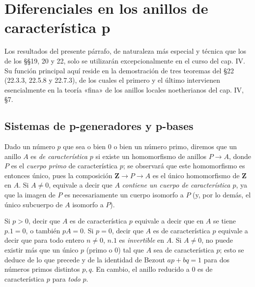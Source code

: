 \section{Diferenciales en los anillos de característica p}
Los resultados del presente párrafo, de naturaleza más especial y técnica que
los de los §§19, 20 y 22, solo se utilizarán excepcionalmente en el curso del
cap. IV. Su función principal aquí reside en la demostración de tres teoremas del §22
(22.3.3, 22.5.8 y 22.7.3), de los cuales el primero y el último intervienen
esencialmente en la teoría «fina» de los anillos locales noetherianos del
cap. IV, §7.
\subsection{Sistemas de p-generadores y p-bases}
\label{0.21.1-fr}

\begin{env}[21.1.1]
\label{0.21.1.1-fr}
Dado un número $p$ que sea o bien $0$ o bien un número primo, diremos que un
anillo $A$ es \emph{de característica $p$} si existe un homomorfismo de anillos
$P\to A$, donde $P$ es el \emph{cuerpo primo} de característica $p$; se observará que
este homomorfismo es entonces único, pues la composición
$\mathbf Z\to P\to A$ es el único homomorfismo de $\mathbf Z$ en $A$.
Si $A\neq0$, equivale a decir que $A$ \emph{contiene un cuerpo de característica
$p$}, ya que la imagen de $P$ es necesariamente un cuerpo isomorfo a $P$ (y,
por lo demás, el único subcuerpo de $A$ isomorfo a $P$).
\end{env}

\begin{env}[21.1.2]
\label{0.21.1.2-fr}
Si $p>0$, decir que $A$ es de característica $p$ equivale a decir que en
$A$ se tiene $p.1=0$, o también $pA=0$. Si $p=0$, decir que $A$ es de
característica $p$ equivale a decir que para todo entero $n\neq0$, $n.1$
es \emph{invertible} en $A$. Si $A\neq0$, no puede existir más que un único $p$
(primo o $0$) tal que $A$ sea de característica $p$; esto se deduce de lo que precede y de la
identidad de Bezout $ap+bq=1$ para dos números primos distintos $p,q$.
En cambio, el anillo reducido a $0$ es de característica $p$ para \emph{todo} $p$.
\end{env}


